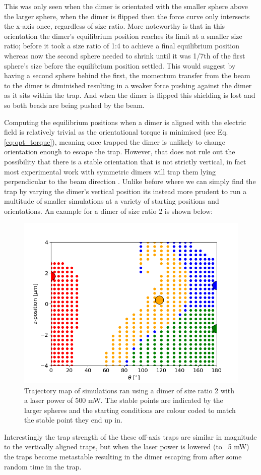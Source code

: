 \documentclass[a4paper,oneside,11pt]{book}
\begin{document}
This was only seen when the dimer is orientated with the smaller sphere above the larger sphere, when the dimer is flipped then the force curve only intersects the x-axis once, regardless of size ratio. More noteworthy is that in this orientation the dimer’s equilibrium position reaches its limit at a smaller size ratio; before it took a size ratio of 1:4 to achieve a final equilibrium position whereas now the second sphere needed to shrink until it was 1/7th of the first sphere’s size before the equilibrium position settled. This would suggest by having a second sphere behind the first, the momentum transfer from the beam to the dimer is diminished resulting in a weaker force pushing against the dimer as it sits within the trap. And when the dimer is flipped this shielding is lost and so both beads are being pushed by the beam.

Computing the equilibrium positions when a dimer is aligned with the electric field is relatively trivial as the orientational torque is minimised (see Eq.\ref{eq:opt_torque}), meaning once trapped the dimer is unlikely to change orientation enough to escape the trap. However, that does not rule out the possibility that there is a stable orientation that is not strictly vertical, in fact most experimental work with symmetric dimers will trap them lying perpendicular to the beam direction \cite{Ahn2018}. Unlike before where we can simply find the trap by varying the dimer's vertical position its instead more prudent to run a multitude of smaller simulations at a variety of starting positions and orientations. An example for a dimer of size ratio 2 is shown below:

\begin{figure}
	\centering
	\includegraphics[width=0.75\linewidth]{off_axis_trap.png}
	\caption{Trajectory map of simulations ran using a dimer of size ratio 2 with a laser power of 500 mW. The stable points are indicated by the larger spheres and the starting conditions are colour coded to match the stable point they end up in.}
\end{figure}

Interestingly the trap strength of the these off-axis traps are similar in magnitude to the vertically aligned traps, but when the laser power is lowered (to ~5 mW) the traps become metastable resulting in the dimer escaping from after some random time in the trap. 


\end{document}
